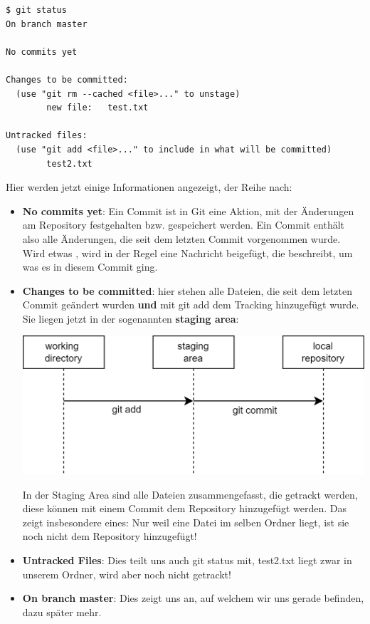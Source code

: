 \documentclass{article}
\begin{document}
\begin{verbatim}
$ git status
On branch master

No commits yet

Changes to be committed:
  (use "git rm --cached <file>..." to unstage)
        new file:   test.txt

Untracked files:
  (use "git add <file>..." to include in what will be committed)
        test2.txt
\end{verbatim}
Hier werden jetzt einige Informationen angezeigt, der Reihe nach: 
\begin{itemize}
    \item \textbf{No commits yet}: Ein Commit ist in Git eine Aktion, mit der Änderungen am Repository festgehalten bzw. gespeichert werden. Ein Commit enthält also alle Änderungen, die seit dem letzten Commit vorgenommen wurde. Wird etwas , wird in der Regel eine Nachricht beigefügt, die beschreibt, um was es in diesem Commit ging. 
    \item \textbf{Changes to be committed}: hier stehen alle Dateien, die seit dem letzten Commit geändert wurden \textbf{und} mit git add dem Tracking hinzugefügt wurde. Sie liegen jetzt in der sogenannten \textbf{staging area}:
    \begin{center}
        \includegraphics[scale=0.25]{../media/git_staging.png}
    \end{center}
    In der Staging Area sind alle Dateien zusammengefasst, die getrackt werden, diese können mit einem Commit dem Repository hinzugefügt werden. Das zeigt insbesondere eines: Nur weil eine Datei im selben Ordner liegt, ist sie noch nicht dem Repository hinzugefügt!
    \item \textbf{Untracked Files}: Dies teilt uns auch git status mit, test2.txt liegt zwar in unserem Ordner, wird aber noch nicht getrackt!
    \item \textbf{On branch master}: Dies zeigt uns an, auf welchem  wir uns gerade befinden, dazu später mehr. 
\end{itemize}
\end{document}
